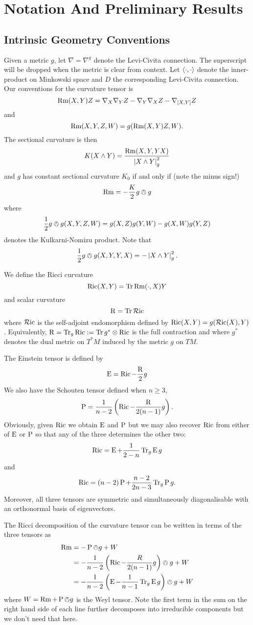 \documentclass[a4paper, 12pt]{amsart}
\begin{document}
\section{Notation And Preliminary Results}
\label{sec:notation}

\subsection{Intrinsic Geometry Conventions}
\label{subsec:notation_intrinsic}

Given a metric \(g\), let \(\nabla = \nabla^g\) denote the Levi-Civita connection. The superscript will be dropped when the metric is clear from context. Let \(\left\langle \cdot,\cdot \right\rangle\) denote the inner-product on Minkowski space and \(D\) the corresponding Levi-Civita connection. Our conventions for the curvature tensor is
\[
\operatorname{Rm}(X, Y) Z = \nabla_X \nabla_Y Z - \nabla_Y \nabla_X Z - \nabla_{[X, Y]} Z
\]
and
\[
\operatorname{Rm}(X, Y, Z, W) = g(\operatorname{Rm}(X, Y) Z, W).
\]
The sectional curvature is then
\[
K(X \wedge Y) = \frac{\operatorname{Rm}(X, Y, Y X)}{\left\lvert{X \wedge Y}\right\rvert_g^2}
\]
and \(g\) has constant sectional curvature \(K_0\) if and only if (note the minus sign!)
\[
\operatorname{Rm} = -\frac{K}{2} g \owedge g
\]
where
\[
\frac{1}{2} g \owedge g (X, Y, Z, W) = g(X, Z) g (Y, W) - g(X, W) g(Y, Z)
\]
denotes the Kulkarni-Nomizu product. Note that
\[
\frac{1}{2} g \owedge g (X, Y, Y, X) = -\left\lvert{X \wedge Y}\right\rvert_g^2.
\]

We define the Ricci curvature
\[
\operatorname{Ric}(X, Y) = \operatorname{Tr} \operatorname{Rm}(\cdot, X) Y
\]
and scalar curvature
\[
\operatorname{R} = \operatorname{Tr} \operatorname{\mathcal{R}ic}
\]
where \(\operatorname{\mathcal{R}ic}\) is the self-adjoint endomorphism defined by \(\operatorname{Ric}(X, Y) = g(\operatorname{\mathcal{R}ic}(X), Y)\). Equivalently, \(\operatorname{R} = \operatorname{Tr}_g \operatorname{Ric} := \operatorname{Tr} g^{\ast} \otimes \operatorname{Ric}\) is the full contraction and where \(g^{\ast}\) denotes the dual metric on \(T^{\ast}M\) induced by the metric \(g\) on \(TM\).

The Einstein tensor is defined by
\[
\operatorname{E} = \operatorname{Ric} - \frac{\operatorname{R}}{2} g
\]
We also have the Schouten tensor defined when \(n \geq 3\),
\[
\operatorname{P} = \frac{1}{n-2} \left(\operatorname{Ric} - \frac{\operatorname{R}}{2(n-1)}g \right).
\]
Obviously, given \(\operatorname{Ric}\) we obtain \(\operatorname{E}\) and \(\operatorname{P}\) but we may also recover \(\operatorname{Ric}\) from either of \(\operatorname{E}\) or \(\operatorname{P}\) so that any of the three determines the other two:
\[
\operatorname{Ric} = \operatorname{E} + \frac{1}{2-n} \operatorname{Tr}_g \operatorname{E} g
\]
and
\[
\operatorname{Ric} = (n-2) \operatorname{P} + \frac{n-2}{2n-3} \operatorname{Tr}_g \operatorname{P} g.
\]
Moreover, all three tensors are symmetric and simultaneously diagonalisable with an orthonormal basis of eigenvectors.

The Ricci decomposition of the curvature tensor can be written in terms of the three tensors as
\begin{align*}
\operatorname{Rm} &= -\operatorname{P} \owedge g + W \\
&= -\frac{1}{n-2} \left(\operatorname{Ric} - \frac{R}{2(n-1)} g\right) \owedge g + W \\
&= -\frac{1}{n-2} \left(\operatorname{E}  -\frac{1}{n-1} \operatorname{Tr}_g \operatorname{E} g\right) \owedge g + W
\end{align*}
where \(W = \operatorname{Rm} + \operatorname{P} \owedge g\) is the Weyl tensor. Note the first term in the sum on the right hand side of each line further decomposes into irreducible components but we don't need that here.
\end{document}
